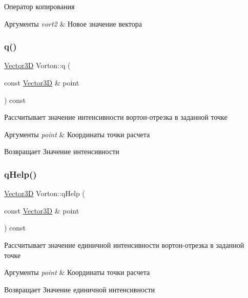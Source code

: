 Оператор копирования 
\begin{DoxyParams}{Аргументы}
{\em vort2} & Новое значение вектора \\
\hline
\end{DoxyParams}
\mbox{\label{class_vorton_a8b514a5ead7e36def408477d3cd43a52}} 
\subsubsection{\texorpdfstring{q()}{q()}}
{\footnotesize\ttfamily \mbox{\hyperlink{class_vector3_d}{Vector3D}} Vorton\+::q (\begin{DoxyParamCaption}\item[{const \mbox{\hyperlink{class_vector3_d}{Vector3D}} \&}]{point }\end{DoxyParamCaption}) const}

Рассчитывает значение интенсивности вортон-\/отрезка в заданной точке 
\begin{DoxyParams}{Аргументы}
{\em point} & Координаты точки расчета \\
\hline
\end{DoxyParams}
\begin{DoxyReturn}{Возвращает}
Значение интенсивности 
\end{DoxyReturn}
\mbox{\label{class_vorton_a384fd259981645366a748be89e3b51e6}} 
\subsubsection{\texorpdfstring{q\+Help()}{qHelp()}}
{\footnotesize\ttfamily \mbox{\hyperlink{class_vector3_d}{Vector3D}} Vorton\+::q\+Help (\begin{DoxyParamCaption}\item[{const \mbox{\hyperlink{class_vector3_d}{Vector3D}} \&}]{point }\end{DoxyParamCaption}) const}

Рассчитывает значение единичной интенсивности вортон-\/отрезка в заданной точке 
\begin{DoxyParams}{Аргументы}
{\em point} & Координаты точки расчета \\
\hline
\end{DoxyParams}
\begin{DoxyReturn}{Возвращает}
Значение единичной интенсивности 
\end{DoxyReturn}
\mbox{\label{class_vorton_ac6f98f9a9c59603874e21ca04c3fb2ff}} 
